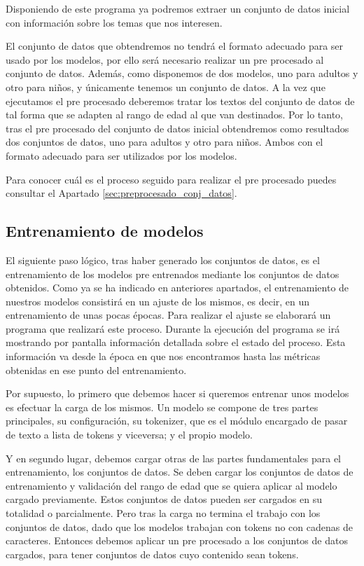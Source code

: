 Disponiendo de este programa ya podremos extraer un conjunto de datos inicial con información sobre los temas que nos interesen.

El conjunto de datos que obtendremos no tendrá el formato adecuado para ser usado por los modelos, por ello será necesario realizar un pre procesado al conjunto de datos. Además, como disponemos de dos modelos, uno para adultos y otro para niños, y únicamente tenemos un conjunto de datos. A la vez que ejecutamos el pre procesado deberemos tratar los textos del conjunto de datos de tal forma que se adapten al rango de edad al que van destinados. Por lo tanto, tras el pre procesado del conjunto de datos inicial obtendremos como resultados dos conjuntos de datos, uno para adultos y otro para niños. Ambos con el formato adecuado para ser utilizados por los modelos.

Para conocer cuál es el proceso seguido para realizar el pre procesado puedes consultar el Apartado \ref{sec:preprocesado_conj_datos}.

\subsection{Entrenamiento de modelos}

El siguiente paso lógico, tras haber generado los conjuntos de datos, es el entrenamiento de los modelos pre entrenados mediante los conjuntos de datos obtenidos. Como ya se ha indicado en anteriores apartados, el entrenamiento de nuestros modelos consistirá en un ajuste de los mismos, es decir, en un entrenamiento de unas pocas épocas. Para realizar el ajuste se elaborará un programa que realizará este proceso. Durante la ejecución del programa se irá mostrando por pantalla información detallada sobre el estado del proceso. Esta información va desde la época en que nos encontramos hasta las métricas obtenidas en ese punto del entrenamiento.

Por supuesto, lo primero que debemos hacer si queremos entrenar unos modelos es efectuar la carga de los mismos. Un modelo se compone de tres partes principales, su configuración, su tokenizer, que es el módulo encargado de pasar de texto a lista de tokens y viceversa; y el propio modelo.

Y en segundo lugar, debemos cargar otras de las partes fundamentales para el entrenamiento, los conjuntos de datos. Se deben cargar los conjuntos de datos de entrenamiento y validación del rango de edad que se quiera aplicar al modelo cargado previamente. Estos conjuntos de datos pueden ser cargados en su totalidad o parcialmente. Pero tras la carga no termina el trabajo con los conjuntos de datos, dado que los modelos trabajan con tokens no con cadenas de caracteres. Entonces debemos aplicar un pre procesado a los conjuntos de datos cargados, para tener conjuntos de datos cuyo contenido sean tokens.

